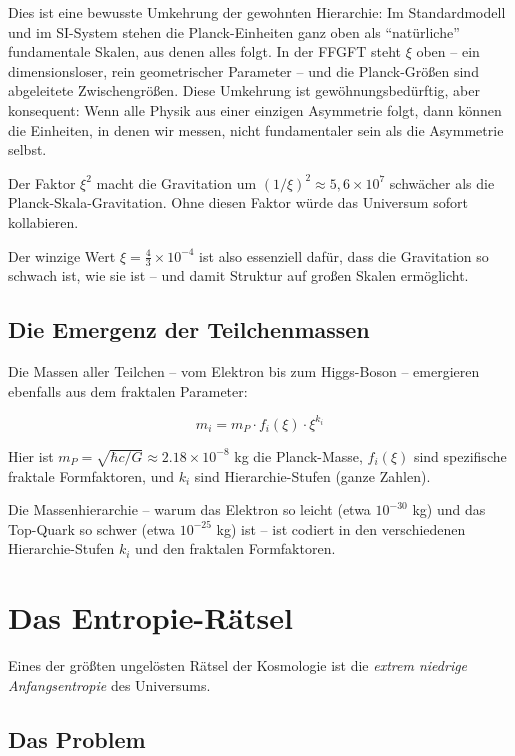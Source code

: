 	Dies ist eine bewusste Umkehrung der gewohnten Hierarchie: Im Standardmodell und im SI-System stehen die Planck-Einheiten ganz oben als \enquote{natürliche} fundamentale Skalen, aus denen alles folgt. In der FFGFT steht $\xi$ oben -- ein dimensionsloser, rein geometrischer Parameter -- und die Planck-Größen sind abgeleitete Zwischengrößen. Diese Umkehrung ist gewöhnungsbedürftig, aber konsequent: Wenn alle Physik aus einer einzigen Asymmetrie folgt, dann können die Einheiten, in denen wir messen, nicht fundamentaler sein als die Asymmetrie selbst.
	
	Der Faktor $\xi^2$ macht die Gravitation um $(1/\xi)^2 \approx 5{,}6 \times 10^7$ schwächer als die Planck-Skala-Gravitation. Ohne diesen Faktor würde das Universum sofort kollabieren.
	
	Der winzige Wert $\xi = \frac{4}{3} \times 10^{-4}$ ist also essenziell dafür, dass die Gravitation so schwach ist, wie sie ist -- und damit Struktur auf großen Skalen ermöglicht.
	
	\subsection{Die Emergenz der Teilchenmassen}
	
	Die Massen aller Teilchen -- vom Elektron bis zum Higgs-Boson -- emergieren ebenfalls aus dem fraktalen Parameter:
	
	\begin{equation}
		m_i = m_P \cdot f_i(\xi) \cdot \xi^{k_i}
	\end{equation}
	
	Hier ist $m_P = \sqrt{\hbar c/G} \approx 2.18 \times 10^{-8}$ kg die Planck-Masse, $f_i(\xi)$ sind spezifische fraktale Formfaktoren, und $k_i$ sind Hierarchie-Stufen (ganze Zahlen).
	
	Die Massenhierarchie -- warum das Elektron so leicht (etwa $10^{-30}$ kg) und das Top-Quark so schwer (etwa $10^{-25}$ kg) ist -- ist codiert in den verschiedenen Hierarchie-Stufen $k_i$ und den fraktalen Formfaktoren.
	
	\section{Das Entropie-Rätsel}
	
	Eines der größten ungelösten Rätsel der Kosmologie ist die \textit{extrem niedrige Anfangsentropie} des Universums.
	
	\subsection{Das Problem}
	
